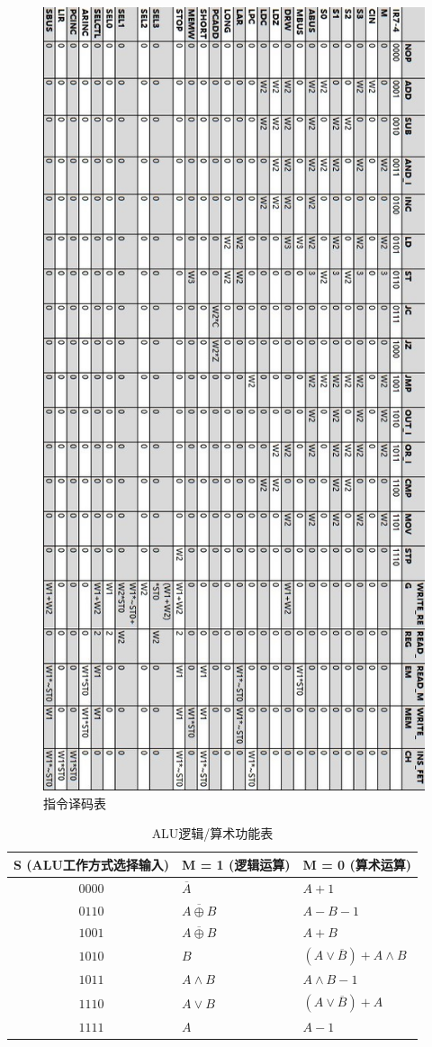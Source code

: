 \documentclass[lang=cn,11pt,a4paper,cite=authornum]{paper}
\begin{document}
\begin{figure}[htbp]
    \centering
    \includegraphics[width=0.73\linewidth]{./Images/code-table.jpg}
    \caption{指令译码表\label{fig:code-table}}
\end{figure}

\begin{table}[!htbp]
    \centering
    \caption{ALU逻辑/算术功能表\label{tab:alutab}}
    \begin{tabular}{|c|l|l|}
        \hline
        S (ALU工作方式选择输入) & M = 1 (逻辑运算)  & M = 0 (算术运算) \\ \hline
        $0000$ & $\overline{A}$ & $A+1$ \\ \hline
        $0110$ & $\overline{A \oplus B}$ & $A-B-1$ \\ \hline
        $1001$ & $\overline{A \oplus B}$ & $A+B$ \\ \hline
        $1010$ & $B$ & $(A\vee\overline B)+A\wedge B$ \\ \hline
        $1011$ & $A\wedge B$ & $A\wedge B-1$ \\ \hline
        $1110$ & $A\vee B$ & $(A\vee\overline B)+A$ \\ \hline
        $1111$ & $A$ & $A-1$ \\ \hline
    \end{tabular}
\end{table}
\end{document}
